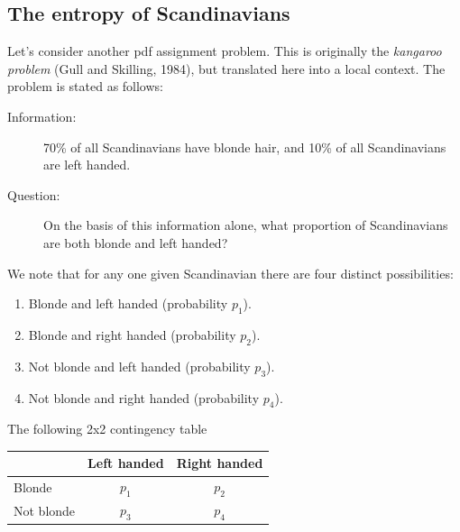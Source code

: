 \documentclass[%
oneside,                 %
final,                   %
10pt]{article}
\begin{document}
\subsection{The entropy of Scandinavians}

Let's consider another pdf assignment problem. This is originally the \emph{kangaroo problem} (Gull and Skilling, 1984), but translated here into a local context. The problem is stated as follows:

\begin{description}
\item[Information:] 
  70\% of all Scandinavians have blonde hair, and 10\% of all Scandinavians are left handed.

\item[Question:] 
  On the basis of this information alone, what proportion of Scandinavians are both blonde and left handed?
\end{description}

\noindent
We note that for any one given Scandinavian there are four distinct possibilities: 
\begin{enumerate}
\item Blonde and left handed (probability $p_1$).

\item Blonde and right handed (probability $p_2$).

\item Not blonde and left handed (probability $p_3$).

\item Not blonde and right handed (probability $p_4$).
\end{enumerate}

\noindent
The following 2x2 contingency table


\vspace{3mm}





\begin{tabular}{lcc}
\hline
\multicolumn{1}{c}{  } & \multicolumn{1}{c}{ Left handed } & \multicolumn{1}{c}{ Right handed } \\
\hline
Blonde     & $p_1$       & $p_2$        \\
Not blonde & $p_3$       & $p_4$        \\
\hline
\end{tabular}


\noindent


\vspace{3mm}
\end{document}
